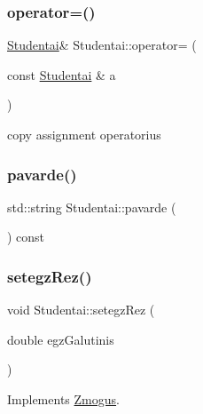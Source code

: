 \subsubsection{\texorpdfstring{operator=()}{operator=()}}
{\footnotesize\ttfamily \mbox{\hyperlink{class_studentai}{Studentai}}\& Studentai\+::operator= (\begin{DoxyParamCaption}\item[{const \mbox{\hyperlink{class_studentai}{Studentai}} \&}]{a }\end{DoxyParamCaption})\hspace{0.3cm}{\ttfamily [inline]}}

copy assignment operatorius \mbox{\label{class_studentai_af77caf5768840f5660954fbe64745efa}} 
\subsubsection{\texorpdfstring{pavarde()}{pavarde()}}
{\footnotesize\ttfamily std\+::string Studentai\+::pavarde (\begin{DoxyParamCaption}{ }\end{DoxyParamCaption}) const\hspace{0.3cm}{\ttfamily [inline]}}

\mbox{\label{class_studentai_ad4979b0c6137e0ce9edad1d609bed522}} 
\subsubsection{\texorpdfstring{setegzRez()}{setegzRez()}}
{\footnotesize\ttfamily void Studentai\+::setegz\+Rez (\begin{DoxyParamCaption}\item[{double}]{egz\+Galutinis }\end{DoxyParamCaption})\hspace{0.3cm}{\ttfamily [virtual]}}



Implements \mbox{\hyperlink{class_zmogus_a19656beb88d5e73a65ceef8c68e191c4}{Zmogus}}.

\mbox{\label{class_studentai_a54ec3efbba483b0184c0fe3eafe40b67}} 
